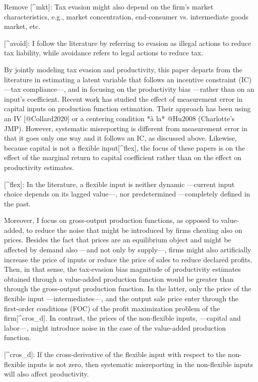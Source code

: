 \documentclass[
  12pt]{article}
\theoremstyle{definition}
\theoremstyle{remark}
\begin{document}
\begin{anfxnote*}{Remove}
[^mkt]: Tax evasion might also depend on the firm's market characteristics, e.g., market concentration, end-consumer vs. intermediate goods market, etc.

[^avoid]:  I follow the literature by referring to evasion as illegal actions to reduce tax liability, while avoidance refers to legal actions to reduce tax.

By jointly modeling tax evasion and productivity, this paper departs from the literature in estimating a latent variable that follows an incentive constraint (IC) —tax compliance—, and in focusing on the productivity bias —rather than on an input's coefficient. Recent work has studied the effect of measurement error in capital inputs on production function estimation. Their approach has been using an IV [@Collard2020] or a centering condition *à la* @Hu2008 (Charlotte's JMP). However, systematic misreporting is different from measurement error in that it goes only one way and it follows an IC, as discussed above. Likewise, because capital is not a flexible input[^flex], the focus of these papers is on the effect of the marginal return to capital coefficient rather than on the effect on productivity estimates.

[^flex]: In the literature, a flexible input is neither dynamic —current input choice depends on its lagged value—, nor predetermined —completely defined in the past.

Moreover, I focus on gross-output production functions, as opposed to value-added, to reduce the noise that might be introduced by firms cheating also on prices. Besides the fact that prices are an equilibrium object and might be affected by demand also —and not only by supply—, firms might also artificially increase the price of inputs or reduce the price of sales to reduce declared profits. Then, in that sense, the tax-evasion bias magnitude of productivity estimates obtained through a value-added production function would be greater than through the gross-output production function. In the latter, only the price of the flexible input —intermediates—, and the output sale price enter through the first-order conditions (FOC) of the profit maximization problem of the firm[^cros_d]. In contrast, the prices of the non-flexible inputs, —capital and labor—, might introduce noise in the case of the value-added production function. 

[^cros_d]: If the cross-derivative of the flexible input with respect to the non-flexible inputs is not zero, then systematic misreporting in the non-flexible inputs will also affect productivity.

\end{anfxnote*}
\end{document}
